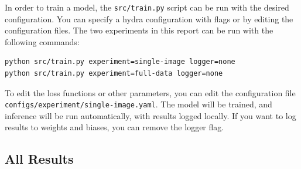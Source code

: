 In order to train a model, the \texttt{src/train.py} script can be run with the desired configuration. You can specify a hydra configuration with flags or by editing the configuration files. The two experiments in this report can be run with the following commands:

\begin{verbatim}
python src/train.py experiment=single-image logger=none
python src/train.py experiment=full-data logger=none
\end{verbatim}

To edit the loss functions or other parameters, you can edit the configuration file \texttt{configs/experiment/single-image.yaml}. The model will be trained, and inference will be run automatically, with results logged locally. If you want to log results to weights and biases, you can remove the logger flag.

\newpage
\subsection{All Results}
\label{sec:all-results}

